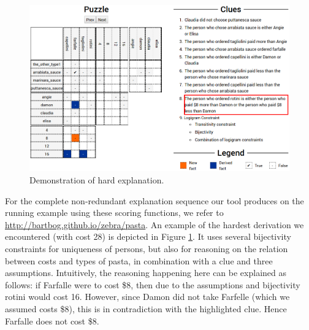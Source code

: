 \begin{figure}[ht]
\centering
\includegraphics[width=\linewidth]{zebra_screen_2}
\caption{Demonstration of hard explanation.}
\label{fig:screen2}
\end{figure}

For the complete non-redundant explanation sequence our tool produces on the running example using these scoring functions, we refer to \url{http://bartbog.github.io/zebra/pasta}. An example of the hardest derivation we encountered (with cost 28) is depicted in Figure \ref{fig:screen2}. It uses several bijectivity constraints for uniqueness of persons, but also for reasoning on the relation between costs and types of pasta, in combination with a clue and three assumptions.
Intuitively, the reasoning happening here can be explained as follows: if Farfalle were to cost \$8, then due to the assumptions and bijectivity rotini would cost 16. However, since Damon did not take Farfelle (which we assumed costs \$8), this is in contradiction with the highlighted clue. Hence Farfalle does not cost \$8. 







